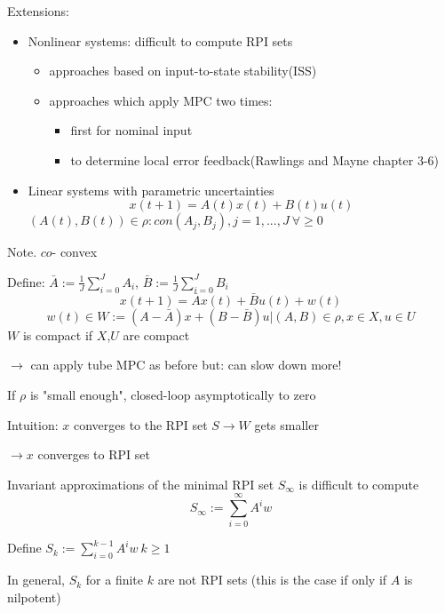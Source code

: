 Extensions:
\begin{itemize}
\item Nonlinear systems: difficult to compute RPI sets
\begin{itemize}
\item approaches based on input-to-state stability(ISS)
\item approaches which apply MPC two times:
\begin{itemize}
\item first for nominal input
\item to determine local error feedback(Rawlings and Mayne chapter 3-6)
\end{itemize}
\end{itemize}
\item Linear systems with parametric uncertainties
\begin{equation*}
x(t+1) = A(t)x(t) + B(t)u(t)
\end{equation*}
$(A(t),B(t)) \in \rho : con{(A_j,B_j), j = 1,...,J} \ \forall \geq 0$ 
\end{itemize}
Note. $co$- convex

Define: $\bar{A} := \frac{1}{J}\sum_{i=0}^{J}A_i$, $\bar{B} := \frac{1}{J}\sum_{i=0}^{J}B_i$
\begin{equation*}
x(t+1) = \bar{A}x(t) + \bar{B}u(t) + w(t)
\end{equation*}
\begin{equation*}
w(t) \in W := {(A-\bar{A})x + (B-\bar{B})u | (A,B) \in \rho, x \in X, u \in U}
\end{equation*}
$W$ is compact if $X$,$U$ are compact

$\rightarrow$ can apply tube MPC as before
but: can slow down more!

If $\rho$ is "small enough", closed-loop asymptotically to zero

Intuition: $x$ converges to the RPI set $S \rightarrow W$ gets smaller 

$\rightarrow x$ converges to RPI set

Invariant approximations of the minimal RPI set $S_{\infty}$ is difficult to compute
\begin{equation*}
S_{\infty} := \sum_{i=0}^{\infty}A^iw
\end{equation*}

Define $S_k := \sum_{i=0}^{k-1}A^iw \ k \geq 1$

In general, $S_k$ for a finite $k$ are not RPI sets (this is the case if only if $A$ is nilpotent)

